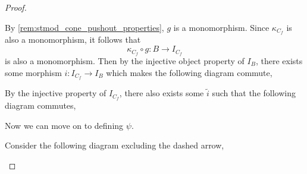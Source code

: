 \begin{proof}
\begin{enumerate}[label={(\bfseries TR\arabic*)}]
{            By \autoref{rem:stmod_cone_pushout_properties}, \( g \) is a monomorphism. Since \( \kappa_{C_f} \) is also a monomorphism, it follows that
            \[
                \kappa_{C_f} \circ g: B \to I_{C_f}
            \]
            is also a monomorphism. Then by the injective object property of \( I_B \), there exists some morphism \( i: I_{C_f} \to I_B \) which makes the following diagram commute,
            \begin{center}
            \end{center}
            By the injective property of \( I_{C_f} \), there also exists some \( \tilde{i} \) such that the following diagram commutes,
            \begin{center}
            \end{center}
            
            Now we can move on to defining \( \psi \).

            Consider the following diagram excluding the dashed arrow,
            \begin{center}
\end{center}}
\end{enumerate}
\end{proof}
